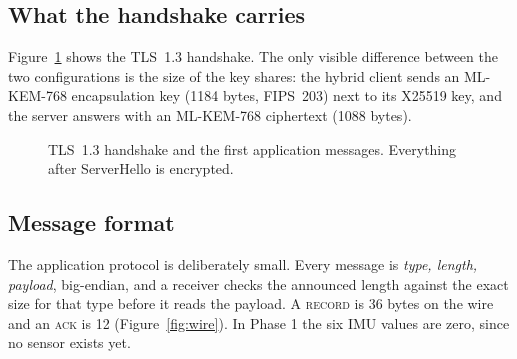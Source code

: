 \documentclass[11pt,a4paper]{article}
\begin{document}
\subsection{What the handshake carries}

Figure~\ref{fig:handshake} shows the TLS~1.3 handshake. The only visible difference between the
two configurations is the size of the key shares: the hybrid client sends an ML-KEM-768
encapsulation key (1184 bytes, FIPS~203) next to its X25519 key, and the server answers with
an ML-KEM-768 ciphertext (1088 bytes).

\begin{figure}[h]
\centering
{}
\caption{TLS~1.3 handshake and the first application messages. Everything after ServerHello
is encrypted.}
\label{fig:handshake}
\end{figure}

\subsection{Message format}

The application protocol is deliberately small. Every message is
\emph{type, length, payload}, big-endian, and a receiver checks the announced length against the
exact size for that type before it reads the payload. A \textsc{record} is 36 bytes on the wire
and an \textsc{ack} is 12 (Figure~\ref{fig:wire}). In Phase 1 the six IMU values are zero, since
no sensor exists yet.
\end{document}
